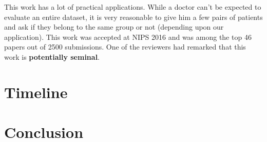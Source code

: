 \documentclass[11pt]{article}
\begin{document}
This work has a lot of practical applications. While a doctor can't be expected to evaluate an entire dataset, it is very reasonable to give him a few pairs of patients and ask if they belong to the same group or not (depending upon our application). This work was accepted at NIPS 2016 and was among the top 46 papers out of 2500 submissions. One of the reviewers had remarked that this work is \textbf{potentially seminal}. 




\section{Timeline}
\label{section:timeline}

\section{Conclusion}
\end{document}
